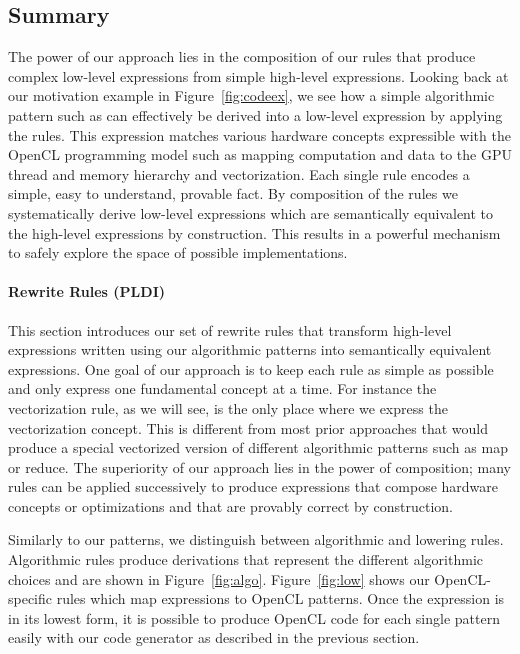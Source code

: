 \subsection{Summary}

The power of our approach lies in the composition of our rules that produce complex low-level expressions from simple high-level expressions.
Looking back at our motivation example in Figure~\ref{fig:codeex}, we see how a simple algorithmic pattern such as  can effectively be derived into a low-level expression by applying the rules.
This expression matches various hardware concepts expressible with the OpenCL programming model such as mapping computation and data to the GPU thread and memory hierarchy and vectorization.
Each single rule encodes a simple, easy to understand, provable fact.
By composition of the rules we systematically derive low-level expressions which are semantically equivalent to the high-level expressions by construction.
This results in a powerful mechanism to safely explore the space of possible implementations.

\paragraph{Rewrite Rules (PLDI)}
This section introduces our set of rewrite rules that transform high-level expressions written using our algorithmic patterns into semantically equivalent expressions.
One goal of our approach is to keep each rule as simple as possible and only express one fundamental concept at a time.
For instance the vectorization rule, as we will see, is the only place where we express the vectorization concept.
This is different from most prior approaches that would produce a special vectorized version of different algorithmic patterns such as map or reduce.
The superiority of our approach lies in the power of composition;
many rules can be applied successively to produce expressions that compose hardware concepts or optimizations and that are provably correct by construction.

Similarly to our patterns, we distinguish between algorithmic and lowering rules.
Algorithmic rules produce derivations that represent the different algorithmic choices and are shown in Figure~\ref{fig:algo}.
Figure~\ref{fig:low} shows our OpenCL-specific rules which map expressions to OpenCL patterns.
Once the expression is in its lowest form, it is possible to produce OpenCL code for each single pattern easily with our code generator as described in the previous section.


